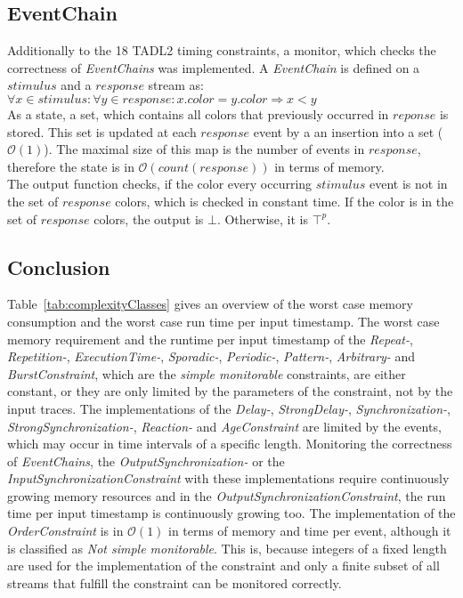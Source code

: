 \subsection{EventChain}
	Additionally to the 18 TADL2 timing constraints, a monitor, which checks the correctness of \textit{EventChains} was implemented. A \textit{EventChain} is defined on a $stimulus$ and a $response$ stream as:\\[10pt]
	$\forall x \in stimulus:\forall y\in response: x.color=y.color\Rightarrow x<y$\\[10pt]
	As a state, a set, which contains all colors that previously occurred in $reponse$ is stored. This set is updated at each $response$  event by a an insertion into a set ($\mathcal{O}(1)$). The maximal size of this map is the number of events in $response$, therefore the state is in $\mathcal{O}(count(response))$ in terms of memory.\\
	The output function checks, if the color every occurring $stimulus$ event is not in the set of $response$ colors, which is checked in constant time. If the color is in the set of $response$ colors, the output is $\bot$. Otherwise, it is $\top^p$.
	
\subsection{Conclusion}
Table~\ref{tab:complexityClasses} gives an overview of the worst case memory consumption and the worst case run time per input timestamp. The worst case memory requirement and the runtime per input timestamp of the \textit{Repeat-}, \textit{Repetition-}, \textit{ExecutionTime-}, \textit{Sporadic-}, \textit{Periodic-}, \textit{Pattern-}, \textit{Arbitrary-} and \textit{BurstConstraint}, which are the \textit{simple monitorable} constraints, are either constant, or they are only limited by the parameters of the constraint, not by the input traces. The implementations of the \textit{Delay-}, \textit{StrongDelay-}, \textit{Synchronization-}, \textit{StrongSynchronization-}, \textit{Reaction-} and \textit{AgeConstraint} are limited by the events, which may occur in time intervals of a specific length. Monitoring the correctness of \textit{EventChains}, the \textit{OutputSynchronization-} or the \textit{InputSynchronizationConstraint} with these implementations require continuously growing memory resources and in the \textit{OutputSynchronizationConstraint}, the run time per input timestamp is continuously growing too. The implementation of the \textit{OrderConstraint} is in $\mathcal{O}(1)$ in terms of memory and time per event, although it is classified as \textit{Not simple monitorable}. This is, because integers of a fixed length are used for the implementation of the constraint and only a finite subset of all streams that fulfill the constraint can be monitored correctly.

